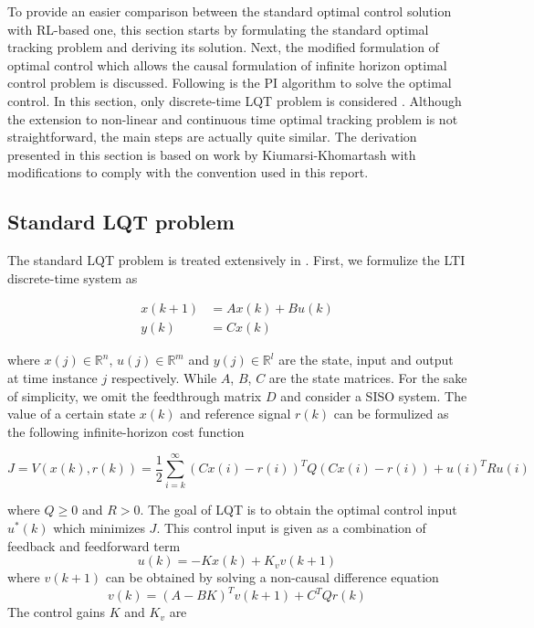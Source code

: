 To provide an easier comparison between the standard optimal control solution with \ac{RL}-based one, this section starts by formulating the standard optimal tracking problem and deriving its solution. Next, the modified formulation of optimal control which allows the causal formulation of infinite horizon optimal control problem is discussed. Following is the \ac{PI} algorithm to solve the optimal control. In this section, only discrete-time \ac{LQT} problem is considered \cite{Kiumarsi6760476}. Although the extension to non-linear and continuous time optimal tracking problem is not straightforward, the main steps are actually quite similar. The derivation presented in this section is based on work by Kiumarsi-Khomartash \cite{Kiumarsi6760476} with modifications to comply with the convention used in this report.

\subsection{Standard LQT problem}
The standard \ac {LQT} problem is treated extensively in \cite{lewis1995optimal}. First, we formulize the \ac {LTI} discrete-time system as 

\begin{equation} \label{eq:ss}
\begin{split}
x(k+1) &= Ax(k) + Bu(k) \\
y(k) &= Cx(k)
\end{split}
\end{equation}

where $x(j) \in \mathbb{R}^n$, $u(j) \in \mathbb{R}^m$ and $y(j) \in \mathbb{R}^l$ are the state, input and output at time instance $j$ respectively. While $A$, $B$, $C$ are the state matrices. For the sake of simplicity, we omit the feedthrough matrix $D$ and consider a \ac {SISO} system. The value of a certain state $x(k)$ and reference signal $r(k)$ can be formulized as the following infinite-horizon cost function

\begin{equation}
\label{eq:infcost}
J = V(x(k), r(k)) = \frac{1}{2} \sum_{i=k}^{\infty} (Cx(i)-r(i))^TQ(Cx(i)-r(i)) + u(i)^TRu(i)
\end{equation}

where $Q \geq 0$ and $R > 0$. The goal of LQT is to obtain the optimal control input $u^*(k)$ which minimizes $J$. This control input is given as a combination of feedback and feedforward term
\begin{equation}
u(k) = -Kx(k) + K_vv(k+1)
\end{equation}
where $v(k+1)$ can be obtained by solving a non-causal difference equation
\begin{equation}
v(k) = (A-BK)^Tv(k+1) + C^TQr(k)
\label{eq:noncausal}
\end{equation}
The control gains $K$ and $K_v$ are

